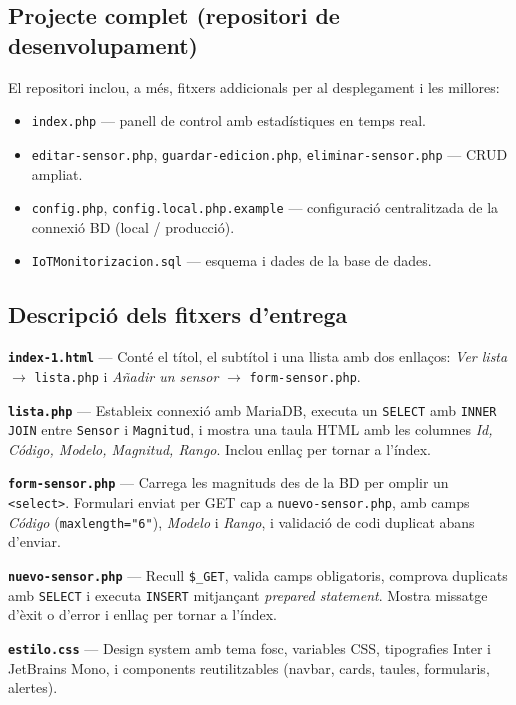\documentclass[12pt, a4paper]{article}
\begin{document}
\subsection{Projecte complet (repositori de desenvolupament)}

El repositori inclou, a més, fitxers addicionals per al desplegament i les millores:

\begin{itemize}
  \item \texttt{index.php} --- panell de control amb estadístiques en temps real.
  \item \texttt{editar-sensor.php}, \texttt{guardar-edicion.php}, \texttt{eliminar-sensor.php} --- CRUD ampliat.
  \item \texttt{config.php}, \texttt{config.local.php.example} --- configuració centralitzada de la connexió BD (local / producció).
  \item \texttt{IoTMonitorizacion.sql} --- esquema i dades de la base de dades.
\end{itemize}

\subsection{Descripció dels fitxers d'entrega}

\textbf{\texttt{index-1.html}} --- Conté el títol, el subtítol i una llista amb dos enllaços: \textit{Ver lista} $\rightarrow$ \texttt{lista.php} i \textit{Añadir un sensor} $\rightarrow$ \texttt{form-sensor.php}.

\textbf{\texttt{lista.php}} --- Estableix connexió amb MariaDB, executa un \texttt{SELECT} amb \texttt{INNER JOIN} entre \texttt{Sensor} i \texttt{Magnitud}, i mostra una taula HTML amb les columnes \textit{Id, Código, Modelo, Magnitud, Rango}. Inclou enllaç per tornar a l'índex.

\textbf{\texttt{form-sensor.php}} --- Carrega les magnituds des de la BD per omplir un \texttt{<select>}. Formulari enviat per GET cap a \texttt{nuevo-sensor.php}, amb camps \textit{Código} (\texttt{maxlength="6"}), \textit{Modelo} i \textit{Rango}, i validació de codi duplicat abans d'enviar.

\textbf{\texttt{nuevo-sensor.php}} --- Recull \texttt{\$\_GET}, valida camps obligatoris, comprova duplicats amb \texttt{SELECT} i executa \texttt{INSERT} mitjançant \textit{prepared statement}. Mostra missatge d'èxit o d'error i enllaç per tornar a l'índex.

\textbf{\texttt{estilo.css}} --- Design system amb tema fosc, variables CSS, tipografies Inter i JetBrains Mono, i components reutilitzables (navbar, cards, taules, formularis, alertes).
\end{document}
